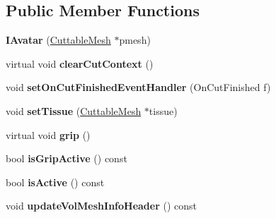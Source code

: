 \subsection*{Public Member Functions}
\begin{DoxyCompactItemize}
\item 
\hypertarget{classps_1_1elastic_1_1IAvatar_a4d83a218b91fd1723c519c853ffbe7e6}{}{\bfseries I\+Avatar} (\hyperlink{classps_1_1elastic_1_1CuttableMesh}{Cuttable\+Mesh} $\ast$pmesh)\label{classps_1_1elastic_1_1IAvatar_a4d83a218b91fd1723c519c853ffbe7e6}

\item 
\hypertarget{classps_1_1elastic_1_1IAvatar_aa50d23f7f090f5c632c5b86a78c9d459}{}virtual void {\bfseries clear\+Cut\+Context} ()\label{classps_1_1elastic_1_1IAvatar_aa50d23f7f090f5c632c5b86a78c9d459}

\item 
\hypertarget{classps_1_1elastic_1_1IAvatar_a4a4baa68f08633a045b026970528b11a}{}void {\bfseries set\+On\+Cut\+Finished\+Event\+Handler} (On\+Cut\+Finished f)\label{classps_1_1elastic_1_1IAvatar_a4a4baa68f08633a045b026970528b11a}

\item 
\hypertarget{classps_1_1elastic_1_1IAvatar_ab841e482707e9d66e60c5b006a2b42c6}{}void {\bfseries set\+Tissue} (\hyperlink{classps_1_1elastic_1_1CuttableMesh}{Cuttable\+Mesh} $\ast$tissue)\label{classps_1_1elastic_1_1IAvatar_ab841e482707e9d66e60c5b006a2b42c6}

\item 
\hypertarget{classps_1_1elastic_1_1IAvatar_a6baf340b02f3505259d3e6ad70407347}{}virtual void {\bfseries grip} ()\label{classps_1_1elastic_1_1IAvatar_a6baf340b02f3505259d3e6ad70407347}

\item 
\hypertarget{classps_1_1elastic_1_1IAvatar_a44b53d02a1416efe7d9d9ec4f7b343d3}{}bool {\bfseries is\+Grip\+Active} () const \label{classps_1_1elastic_1_1IAvatar_a44b53d02a1416efe7d9d9ec4f7b343d3}

\item 
\hypertarget{classps_1_1elastic_1_1IAvatar_a6e78ef39d5dcc024a32cecbbcefb7d75}{}bool {\bfseries is\+Active} () const \label{classps_1_1elastic_1_1IAvatar_a6e78ef39d5dcc024a32cecbbcefb7d75}

\item 
\hypertarget{classps_1_1elastic_1_1IAvatar_a3613c7eaae173b24dae94b7ff461d773}{}void {\bfseries update\+Vol\+Mesh\+Info\+Header} () const \label{classps_1_1elastic_1_1IAvatar_a3613c7eaae173b24dae94b7ff461d773}


\end{DoxyCompactItemize}
